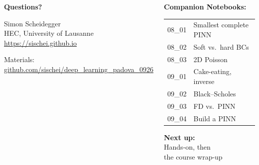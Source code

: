 \documentclass[aspectratio=169,11pt]{beamer}
\begin{document}
\begin{frame}{}
\begin{columns}[c]
\begin{center}
{\Huge \textcolor{uzhblue}{\textbf{Questions?}}}

\vspace{1.0cm}
{\large Simon Scheidegger}\\[4pt]
{\small HEC, University of Lausanne}\\[4pt]
\url{https://sischei.github.io}

\vspace{0.6cm}
{\small Materials:}\\{\scriptsize\href{https://github.com/sischei/deep_learning_padova_0926}{github.com/sischei/deep\_learning\_padova\_0926}}
\end{center}

\begin{center}
\textbf{Companion Notebooks:}\\[8pt]
{\small
\begin{tabular}{rl}
08\_01 & Smallest complete PINN \\
08\_02 & Soft vs.\ hard BCs \\
08\_03 & 2D Poisson \\
09\_01 & Cake-eating, inverse \\
09\_02 & Black--Scholes \\
09\_03 & FD vs.\ PINN \\
09\_04 & Build a PINN \\
\end{tabular}
}

\vspace{0.7cm}
\textbf{Next up:}\\[6pt]
{\large Hands-on, then}\\
{\large the course wrap-up}
\end{center}
\end{columns}
\end{frame}
\end{document}

